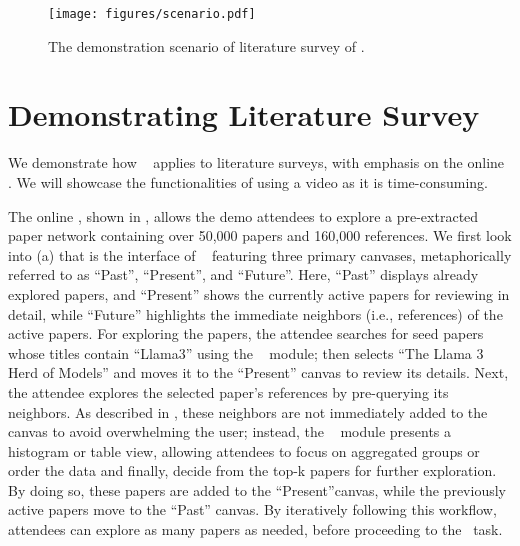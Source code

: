 
\begin{figure*}[t]
  \centering
  \texttt{[image: figures/scenario.pdf]}
  \caption{The demonstration scenario of literature survey of \sys.}
  \label{fig:scenario}
  \vspace*{-1em}
\end{figure*}

\section{Demonstrating Literature Survey}
\label{sec:scenario}
We demonstrate how \sys~ applies to literature surveys, with emphasis on the online \surveyor.
We will showcase the functionalities of \scrapper using a video as it is time-consuming. %


The online \surveyor, shown in , allows the demo attendees to explore a pre-extracted paper network containing over 50,000 papers and 160,000 references. We first look into (a) that is the interface of \explorer~  featuring three primary canvases, metaphorically referred to as ``Past'', ``Present'', and ``Future''. Here, ``Past'' displays already explored papers, and ``Present'' shows the currently active papers for reviewing in detail, while ``Future'' highlights the immediate neighbors (i.e., references) of the active papers.
For exploring the papers, the attendee  searches for seed papers whose titles contain “Llama3” using the \search~ module;  then selects “The Llama 3 Herd of Models” and moves it to the ``Present'' canvas to review its details. Next,  the attendee explores the selected paper’s references by pre-querying its neighbors. As described in , these neighbors are not immediately added to the canvas to avoid overwhelming the user; instead,  the \statfilter~ module presents a histogram or table view, allowing attendees to focus on aggregated groups or order the data and finally,  decide from the top-k papers for further exploration. By doing so, these papers are added to the ``Present''canvas, while the previously active papers move to the ``Past'' canvas. By iteratively following this workflow, attendees  can explore as many papers as needed, before proceeding to the \generator~task.

